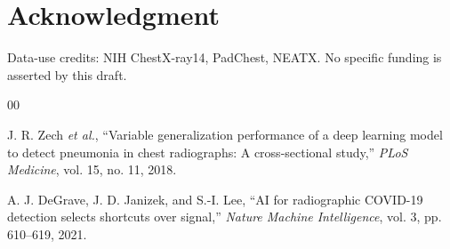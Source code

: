 \documentclass{ieeeaccess}
\begin{document}
\section*{Acknowledgment}
Data-use credits: NIH ChestX-ray14, PadChest, NEATX. No specific funding is
asserted by this draft.


\begin{thebibliography}{00}

 J. R. Zech \emph{et al.}, ``Variable generalization performance of a deep learning model to detect pneumonia in chest radiographs: A cross-sectional study,'' \emph{PLoS Medicine}, vol. 15, no. 11, 2018.

 A. J. DeGrave, J. D. Janizek, and S.-I. Lee, ``AI for radiographic COVID-19 detection selects shortcuts over signal,'' \emph{Nature Machine Intelligence}, vol. 3, pp. 610--619, 2021.

\end{thebibliography}
\EOD
\end{document}
